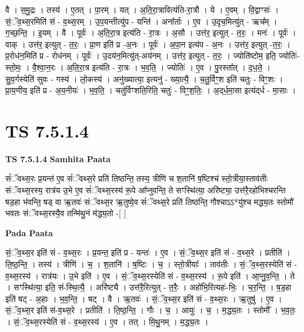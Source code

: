 \documentclass[17pt]{extarticle}
\begin{document}
वै । स॒मु॒द्रः । तस्य॑ । ए॒तत् । पा॒रम् । यत् । अ॒ति॒रा॒त्रावित्य॑ति-रा॒त्रौ । ये । ए॒वम् । वि॒द्वाꣳसः॑ । सं॒ॅव॒थ्स॒रमिति॑ सं - व॒थ्स॒रम् । उ॒प॒यन्तीत्यु॑प - यन्ति॑ । अना᳚र्ताः । ए॒व । उ॒दृच॒मित्यु॑त् - ऋच᳚म् । ग॒च्छ॒न्ति॒ । इ॒यम् । वै । पूर्वः॑ । अ॒ति॒रा॒त्र इत्य॑ति - रा॒त्रः । अ॒सौ । उत्त॑र॒ इत्युत् - त॒रः॒ । मनः॑ । पूर्वः॑ । वाक् । उत्त॑र॒ इत्युत् - त॒रः॒ । प्रा॒ण इति॑ प्र -अ॒नः । पूर्वः॑ । अ॒पा॒न इत्य॑प -   अ॒नः । उत्त॑र॒ इत्युत् -त॒रः॒ । प्र॒रोध॑न॒मिति॑ प्र - रोध॑नम् । पूर्वः॑ । उ॒दय॑न॒मित्यु॑त्-अय॑नम् । उत्त॑र॒ इत्युत् - त॒रः॒ । ज्योति॑ष्टोम॒ इति॒ ज्योतिः॑-स्तो॒मः॒ । वै॒श्वा॒न॒रः । अ॒ति॒रा॒त्र इत्य॑ति - रा॒त्रः । भ॒व॒ति॒ । ज्योतिः॑ । ए॒व । पु॒रस्ता᳚त् । द॒ध॒ते॒ । सु॒व॒र्गस्येति॑ सुवः - गस्य॑ । लो॒कस्य॑ । अनु॑ख्यात्या॒ इत्यनु॑ - ख्या॒त्यै॒ । च॒तु॒र्विꣳ॒॒श इति॑ चतुः - विꣳ॒॒शः । प्रा॒य॒णीय॒ इति॑ प्र - अ॒य॒नीयः॑ । भ॒व॒ति॒ । चतु॑र्विꣳशति॒रिति॒ चतुः॑ - विꣳ॒॒श॒तिः॒ । अ॒द्‌र्ध॒मा॒सा इत्य॑द्‌र्ध - मा॒साः ।  \newline




\section*{ TS 7.5.1.4 }

\textbf{TS 7.5.1.4 } \newline
\textbf{Samhita Paata} \newline

सं॑ॅवथ्स॒रः प्र॒यन्त॑ ए॒व सं॑ॅवथ्स॒रे प्रति॑ तिष्ठन्ति॒ तस्य॒ त्रीणि॑ च श॒तानि॑ ष॒ष्टिश्च॑ स्तो॒त्रीया॒स्ताव॑तीः संॅवथ्स॒रस्य॒ रात्र॑य उ॒भे ए॒व सं॑ॅवथ्स॒रस्य॑ रू॒पे आ᳚प्नुवन्ति॒ ते सꣳस्थि॑त्या॒ अरि॑ष्ट्या॒ उत्त॑रै॒रहो॑भिश्चरन्ति षड॒हा भ॑वन्ति॒ षड् वा ऋ॒तवः॑ संॅवथ्स॒र ऋ॒तुष्वे॒व सं॑ॅवथ्स॒रे प्रति॑ तिष्ठन्ति॒ गौश्चाऽऽ*यु॑श्च मद्ध्य॒तः स्तोमौ॑ भवतः संॅवथ्स॒रस्यै॒व तन्मि॑थु॒नं म॑द्ध्य॒तो -[  ] \newline

\textbf{Pada Paata} \newline

सं॒ॅव॒थ्स॒र इति॑ सं - व॒थ्स॒रः । प्र॒यन्त॒ इति॑ प्र - यन्तः॑ । ए॒व । सं॒ॅव॒थ्स॒र इति॑ सं - व॒थ्स॒रे । प्रतीति॑ । ति॒ष्ठ॒न्ति॒ । तस्य॑ । त्रीणि॑ । च॒ । श॒तानि॑ । ष॒ष्टिः । च॒ । स्तो॒त्रीयाः᳚ । ताव॑तीः । सं॒ॅव॒थ्स॒रस्येति॑ सं - व॒थ्स॒रस्य॑ । रात्र॑यः । उ॒भे इति॑ । ए॒व । सं॒ॅव॒थ्स॒रस्येति॑ सं - व॒थ्स॒रस्य॑ । रू॒पे इति॑ । आ॒प्नु॒व॒न्ति॒ । ते । सꣳस्थि॑त्या॒ इति॒ सं-स्थि॒त्यै॒ । अरि॑ष्ट्यै । उत्त॑रै॒रित्युत् - त॒रैः॒ । अहो॑भि॒रित्यहः॑-भिः॒ । च॒र॒न्ति॒ । ष॒ड॒हा इति॑ षट् - अ॒हाः । भ॒व॒न्ति॒ । षट् । वै । ऋ॒तवः॑ । सं॒ॅव॒थ्स॒र इति॑ सं - व॒थ्स॒रः । ऋ॒तुषु॑ । ए॒व । सं॒ॅव॒थ्स॒र इति॑ सं-व॒थ्स॒रे । प्रतीति॑ । ति॒ष्ठ॒न्ति॒ । गौः । च॒ । आयुः॑ । च॒ । म॒द्ध्य॒तः । स्तोमौ᳚ । भ॒व॒तः॒ । सं॒ॅव॒थ्स॒रस्येति॑ सं - व॒थ्स॒रस्य॑ । ए॒व । तत् । मि॒थु॒नम् । म॒द्ध्य॒तः ।  \newline
\end{document}
